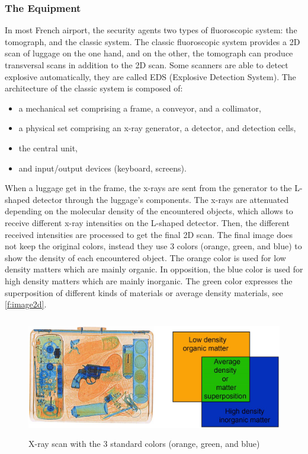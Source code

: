 \subsubsection{The Equipment}

In most French airport, the security agents two types of fluoroscopic system: the tomograph, and the classic system. The classic fluoroscopic system provides a 2D scan of luggage on the one hand, and on the other, the tomograph can produce transversal scans in addition to the 2D scan. Some scanners are able to detect explosive automatically, they are called EDS (Explosive Detection System). The architecture of the classic system is composed of:
\begin{itemize}
\item a mechanical set comprising a frame, a conveyor, and a collimator,
\item a physical set comprising an x-ray generator, a detector, and detection cells,
\item the central unit,
\item and input/output devices (keyboard, screens).
\end{itemize}
When a luggage get in the frame, the x-rays are sent from the generator to the L-shaped detector through the luggage's components. The x-rays are attenuated depending on the molecular density of the encountered objects, which allows to receive different x-ray intensities on the L-shaped detector. Then, the different received intensities are processed to get the final 2D scan.
The final image does not keep the original colors, instead they use 3 colors (orange, green, and blue) to show the density of each encountered object. The orange color is used for low density matters which are mainly organic. In opposition, the blue color is used for high density matters which are mainly inorganic. The green color expresses the superposition of different kinds of materials or average density materials, see \autoref{f:image2d}.

\begin{figure}
\centering
	\includegraphics[height=5.2cm]{Figures/contour}
	\caption{ X-ray scan with the 3 standard colors (orange, green, and blue)}
	\label{f:image2d}
\end{figure}

